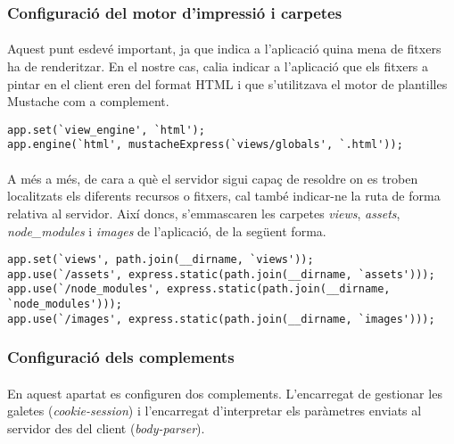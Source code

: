    \subsubsection{Configuració del motor d'impressió i carpetes}

    \paragraph{}
    Aquest punt esdevé important, ja que indica a l'aplicació quina mena de fitxers ha de renderitzar. En el nostre cas, calia indicar a l'aplicació que els fitxers a pintar en el client eren del format HTML i que s'utilitzava el motor de plantilles Mustache com a complement.

    \begin{lstlisting}[style=rawOwn,caption={Declaració del motor d'impressió}]
app.set(`view_engine', `html');
app.engine(`html', mustacheExpress(`views/globals', `.html'));
    \end{lstlisting}

    \paragraph{}
    A més a més, de cara a què el servidor sigui capaç de resoldre on es troben lo\-ca\-lit\-zats els diferents recursos o fitxers, cal també indicar-ne la ruta de forma relativa al servidor. Així doncs, s'emmascaren les carpetes \emph{views}, \emph{assets}, \emph{node\_modules} i \emph{images} de l'aplicació, de la següent forma.

    \begin{lstlisting}[style=rawOwn,caption={Configuració de les rutes a les carpetes amb fitxers}]
app.set(`views', path.join(__dirname, `views'));
app.use(`/assets', express.static(path.join(__dirname, `assets')));
app.use(`/node_modules', express.static(path.join(__dirname, `node_modules')));
app.use(`/images', express.static(path.join(__dirname, `images')));
    \end{lstlisting}


    \subsubsection{Configuració dels complements}

    \paragraph{}
    En aquest apartat es configuren dos complements. L'encarregat de gestionar les galetes (\emph{cookie-session}) i l'encarregat d'interpretar els paràmetres enviats al servidor des del client (\emph{body-parser}).

